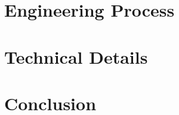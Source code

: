 \documentclass[11pt]{article}
\begin{document}
    

    \section{Engineering Process}\label{sec:eng-process}

    \section{Technical Details}\label{sec:technical-details}
    

    \section{Conclusion}\label{sec:conclusion}
    
\end{document}
